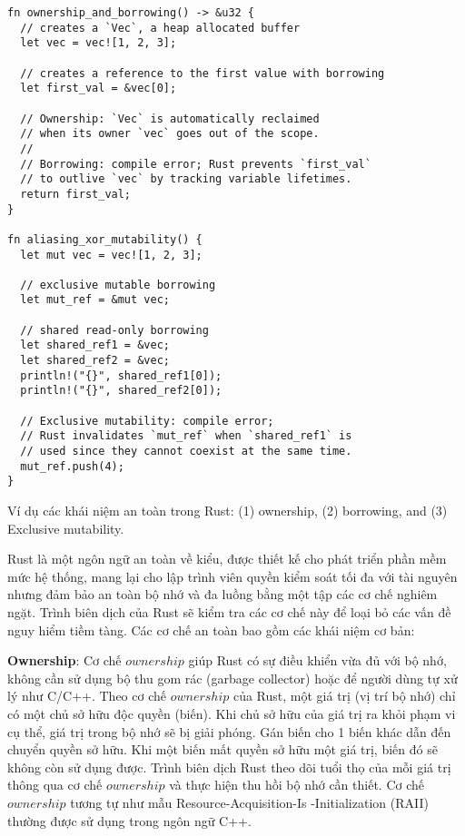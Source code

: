 \begin{listing}[H]
\begin{verbatim}
fn ownership_and_borrowing() -> &u32 {
  // creates a `Vec`, a heap allocated buffer
  let vec = vec![1, 2, 3];

  // creates a reference to the first value with borrowing
  let first_val = &vec[0];

  // Ownership: `Vec` is automatically reclaimed
  // when its owner `vec` goes out of the scope.
  //
  // Borrowing: compile error; Rust prevents `first_val`
  // to outlive `vec` by tracking variable lifetimes.
  return first_val;
}

fn aliasing_xor_mutability() {
  let mut vec = vec![1, 2, 3];

  // exclusive mutable borrowing
  let mut_ref = &mut vec;

  // shared read-only borrowing
  let shared_ref1 = &vec;
  let shared_ref2 = &vec;
  println!("{}", shared_ref1[0]);
  println!("{}", shared_ref2[0]);

  // Exclusive mutability: compile error;
  // Rust invalidates `mut_ref` when `shared_ref1` is
  // used since they cannot coexist at the same time.
  mut_ref.push(4);
}
\end{verbatim}
\caption{Ví dụ các khái niệm an toàn trong Rust: (1) ownership, (2) borrowing, and (3) Exclusive mutability.}
\label{code:c2_safe_rust}
\end{listing}
Rust là một ngôn ngữ an toàn về kiểu,
được thiết kế cho phát triển phần mềm mức hệ thống,
mang lại cho lập trình viên quyền kiểm soát tối đa với tài nguyên nhưng đảm bảo an toàn bộ nhớ và đa luồng bằng một tập các cơ chế nghiêm ngặt.
Trình biên dịch của Rust sẽ kiểm tra các cơ chế này để loại bỏ các vấn đề nguy hiểm tiềm tàng.
Các cơ chế an toàn bao gồm các khái niệm cơ bản:

\textbf{Ownership}: Cơ chế $ownership$ giúp Rust có sự điều khiển vừa đủ với bộ nhớ, không cần sử dụng bộ thu gom rác (garbage collector) hoặc để người dùng tự xử lý như C/C++.
Theo cơ chế $ownership$ của Rust, một giá trị (vị trí bộ nhớ) chỉ có một chủ sở hữu độc quyền (biến).
Khi chủ sở hữu của giá trị ra khỏi phạm vi cụ thể, giá trị trong bộ nhớ sẽ bị giải phóng.
Gán biến cho 1 biến khác dẫn đến chuyển quyền sở hữu.
Khi một biến mất quyền sở hữu một giá trị, biến đó sẽ không còn sử dụng được.
Trình biên dịch Rust theo dõi tuổi thọ của mỗi giá trị thông qua cơ chế $ownership$ và thực hiện thu hồi bộ nhớ cần thiết.
Cơ chế $ownership$ tương tự như mẫu Resource-Acquisition-Is -Initialization (RAII) \cite{cppreferenceRAIICppreferencecom} thường được sử dụng trong ngôn ngữ C++.

